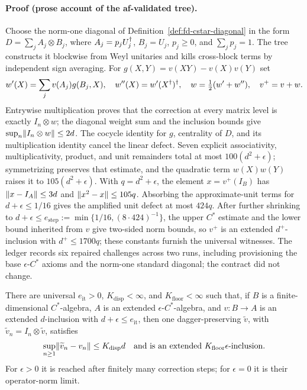 \paragraph{Proof (prose account of the af-validated tree).}
Choose the norm-one diagonal of Definition~\ref{def:fd-cstar-diagonal} in the form
$D=\sum_j A_j\otimes B_j$, where $A_j=p_jU_j^{\dagger}$, $B_j=U_j$,
$p_j\ge0$, and $\sum_jp_j=1$.  The tree constructs it blockwise from Weyl
unitaries and kills cross-block terms by independent sign averaging.  For
$g(X,Y)=v(XY)-v(X)v(Y)$ set
\[
 w'(X)=\sum_jv(A_j)g(B_j,X),\quad
 w''(X)=w'(X^{\dagger})^{\dagger},\quad w=\tfrac12(w'+w''),\quad v^{+}=v+w.
\]
Entrywise multiplication proves that the correction at every matrix level is
exactly $I_n\otimes w$; the diagonal weight sum and the inclusion bounds give
$\sup_n\lVert I_n\otimes w\rVert\le2d$.  The cocycle identity for $g$, centrality of
$D$, and its multiplication identity cancel the linear defect.  Seven explicit
associativity, multiplicativity, product, and unit remainders total at most
$100(d^{2}+\epsilon)$; symmetrizing preserves that estimate, and the quadratic
term $w(X)w(Y)$ raises it to $105(d^{2}+\epsilon)$.  With
$q=d^{2}+\epsilon$, the element $x=v^{+}(I_B)$ has
$\lVert x-I_A\rVert\le3d$ and $\lVert x^{2}-x\rVert\le105q$.  Absorbing the approximate-unit
terms for $d+\epsilon\le1/16$ gives the amplified unit defect at most $424q$.
After further shrinking to $d+\epsilon\le e_{\mathrm{step}}:=\min\{1/16,(8\cdot424)^{-1}\}$, the upper $C^{*}$ estimate and the lower bound inherited from $v$ give
two-sided norm bounds, so $v^{+}$ is an extended $d^{+}$-inclusion with
$d^{+}\le1700q$; these constants furnish the universal witnesses.  The ledger
records six repaired challenges across two runs, including provisioning the base
$\epsilon$-$C^{*}$ axioms and the norm-one standard diagonal; the contract did not change.

\begin{lemma}\label{lem:maincb-improvement-iteration}
There are universal $e_{\mathrm{it}}>0$, $K_{\mathrm{disp}}<\infty$, and
$K_{\mathrm{floor}}<\infty$ such that, if $B$ is a finite-dimensional
$C^{*}$-algebra, $A$ is an extended $\epsilon$-$C^{*}$-algebra, and
$v:B\to A$ is an extended $d$-inclusion with $d+\epsilon\le e_{\mathrm{it}}$,
then one dagger-preserving $\widetilde v$, with
$\widetilde v_n=I_n\otimes\widetilde v$, satisfies
\[
 \sup_{n\ge1}\lVert \widetilde v_n-v_n\rVert\le K_{\mathrm{disp}}d
 \quad\text{and is an extended }K_{\mathrm{floor}}\epsilon\text{-inclusion}.
\]
For $\epsilon>0$ it is reached after finitely many correction steps; for
$\epsilon=0$ it is their operator-norm limit.
\end{lemma}


